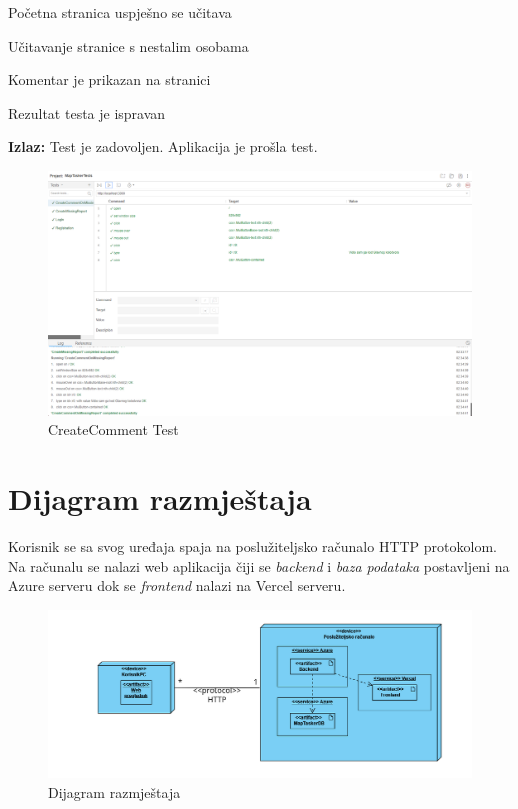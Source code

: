			\begin{packed_enum}
				
				\item Početna stranica uspješno se učitava
				\item Učitavanje stranice s nestalim osobama
				\item Komentar je prikazan na stranici
				\item Rezultat testa je ispravan
				
			\end{packed_enum}
			
			\noindent \textbf{Izlaz:} Test je zadovoljen. Aplikacija je prošla test.
			
			\begin{figure}[H] \includegraphics[width=\linewidth]{./slike/Testovi/Selenium/Selenium_4.png}
				\caption{CreateComment Test}
			\end{figure}
			
			\eject
		
		
		\section{Dijagram razmještaja}
						
		Korisnik se sa svog uređaja spaja na poslužiteljsko računalo HTTP protokolom. Na računalu se nalazi web aplikacija čiji se \textit{backend} i \textit{baza podataka} postavljeni na Azure serveru dok se \textit{frontend} nalazi na Vercel serveru.
            
			\begin{figure}[H]
					\includegraphics[scale=0.55]{dijagrami/DijagramRazm.png} %
					\centering
					\caption{Dijagram razmještaja}
					\label{fig:promjene}
			\end{figure}


